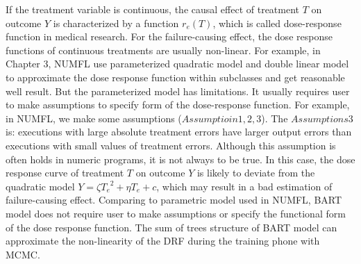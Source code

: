 If the treatment variable is continuous, the causal effect of treatment $T$ on outcome $Y$ is characterized by a function $r_e (T)$, which is called dose-response function in medical research. For the failure-causing effect, the dose response functions of continuous treatments are usually non-linear. For example, in Chapter 3, NUMFL use parameterized quadratic model and double linear model to approximate the dose response function within subclasses and get reasonable well result. But the parameterized model has limitations. It usually requires user to make assumptions to specify form of the dose-response function.  For example, in NUMFL, we make some assumptions ($Assumptioin 1, 2, 3$).  The  $Assumptions3$ is: executions with large absolute treatment errors have larger output errors than executions with small values of treatment errors.  Although this assumption is often holds in numeric programs, it is not always to be true. In this case,  the dose response curve of treatment $T$ on outcome $Y$ is likely to deviate from the quadratic model $Y = \zeta {T_e}^2 + \eta {T_e} + c$, which may result in a bad estimation of failure-causing effect. Comparing to parametric model used in NUMFL, BART model does not require user to make assumptions or specify the functional form of the dose response function. The sum of trees structure of BART model can approximate the non-linearity of the DRF during the training phone with MCMC.

